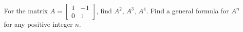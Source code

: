 For the matrix 
$A = \begin{bmatrix} 1 & -1 \\ 0 & 1 \end{bmatrix}$, find $A^2$, $A^3$, $A^4$. 
 Find a general formula for $A^n$ for any positive integer $n$.
